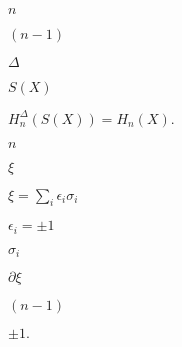 \documentclass[10pt]{book}
\begin{document}
\begin{mdSnippets}
\begin{mdInlineSnippet}[7b8b965ad4bca0e41ab51de7b31363a1]%
$n$\end{mdInlineSnippet}%
\begin{mdInlineSnippet}[cee44a4736519848cd908612350c85fe]%
$(n-1)$\end{mdInlineSnippet}%
\begin{mdInlineSnippet}[967878d1da852d4b07a961e3168b0fff]%
$\Delta$\end{mdInlineSnippet}%
\begin{mdInlineSnippet}%
$S(X)$\end{mdInlineSnippet}%
\begin{mdInlineSnippet}[78ea892312a5dcfcfd73fa79fd3f9eb9]%
$H_n^\Delta(S(X)) = H_n(X).$\end{mdInlineSnippet}%
\begin{mdInlineSnippet}[7b8b965ad4bca0e41ab51de7b31363a1]%
$n$\end{mdInlineSnippet}%
\begin{mdInlineSnippet}%
$\xi$\end{mdInlineSnippet}%
\begin{mdInlineSnippet}[6d60b6d7e1027e8fd453a581e1dc9c93]%
$\xi = \sum_i \epsilon_i \sigma_i$\end{mdInlineSnippet}%
\begin{mdInlineSnippet}[c300966b80a90444e09d6c85734df8d6]%
$\epsilon_i = \pm 1$\end{mdInlineSnippet}%
\begin{mdInlineSnippet}[65445646e7a531a2185d03b58b4d60e1]%
$\sigma_i$\end{mdInlineSnippet}%
\begin{mdInlineSnippet}[248b9f7836d8f964019d51ce9b8ea547]%
$\partial\xi$\end{mdInlineSnippet}%
\begin{mdInlineSnippet}[cee44a4736519848cd908612350c85fe]%
$(n-1)$\end{mdInlineSnippet}%
\begin{mdInlineSnippet}%
$\pm 1.$\end{mdInlineSnippet}%

\end{mdSnippets}
\end{document}
